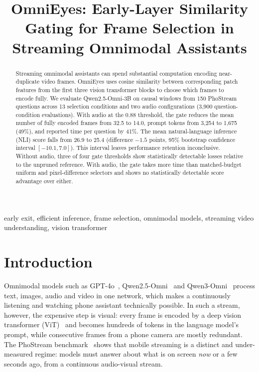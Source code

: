 \documentclass[conference]{IEEEtran}
\begin{document}
\title{OmniEyes: Early-Layer Similarity Gating for Frame Selection in Streaming Omnimodal Assistants}

\author{
}

\maketitle

\begin{abstract}
Streaming omnimodal assistants can spend substantial computation encoding near-duplicate video frames. OmniEyes uses cosine similarity between corresponding patch features from the first three vision transformer blocks to choose which frames to encode fully. We evaluate Qwen2.5-Omni-3B on causal windows from 150 PhoStream questions across 13 selection conditions and two audio configurations (3{,}900 question-condition evaluations). With audio at the 0.88 threshold, the gate reduces the mean number of fully encoded frames from 32.5 to 14.0, prompt tokens from 3{,}254 to 1{,}675 (49\%), and reported time per question by 41\%. The mean natural-language inference (NLI) score falls from 26.9 to 25.4 (difference $-1.5$ points, 95\% bootstrap confidence interval $[-10.1,7.0]$). This interval leaves performance retention inconclusive. Without audio, three of four gate thresholds show statistically detectable losses relative to the unpruned reference. With audio, the gate takes more time than matched-budget uniform and pixel-difference selectors and shows no statistically detectable score advantage over either.
\end{abstract}

\begin{IEEEkeywords}
early exit, efficient inference, frame selection, omnimodal models, streaming video understanding, vision transformer
\end{IEEEkeywords}

\section{Introduction}
Omnimodal models such as GPT-4o~\cite{openai2024gpt4o}, Qwen2.5-Omni~\cite{xu2025qwen25omni} and Qwen3-Omni~\cite{xu2025qwen3omni} process text, images, audio and video in one network, which makes a continuously listening and watching phone assistant technically possible. In such a stream, however, the expensive step is visual: every frame is encoded by a deep vision transformer (ViT)~\cite{dosovitskiy2021vit} and becomes hundreds of tokens in the language model's prompt, while consecutive frames from a phone camera are mostly redundant. The PhoStream benchmark~\cite{lu2026phostream} shows that mobile streaming is a distinct and under-measured regime: models must answer about what is on screen \emph{now} or a few seconds ago, from a continuous audio-visual stream.
\end{document}
